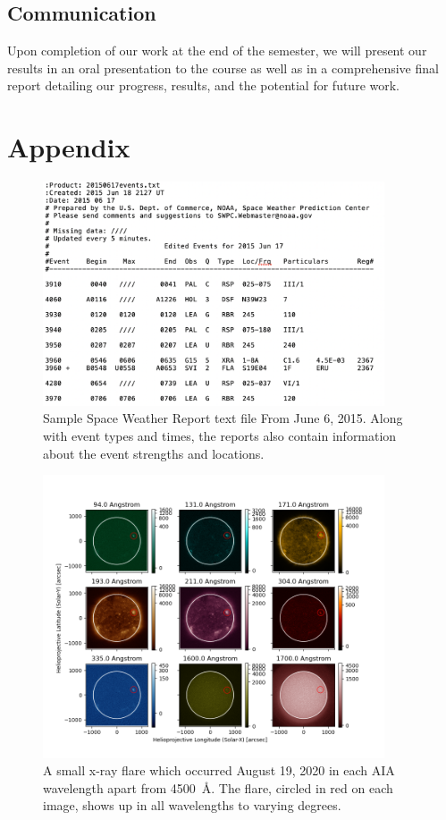 \documentclass[12pt, letterpaper]{article}
\begin{document}
\subsection*{Communication}
Upon completion of our work at the end of the semester, we will present our results in an oral presentation to the course as well as in a comprehensive final report detailing our progress, results, and the potential for future work.






\pagebreak
\section*{Appendix}


\begin{figure}[ht]
    \includegraphics[width=0.9\textwidth]{figures/swr_sample.png}
    \centering
    \caption{Sample Space Weather Report text file From June 6, 2015. Along with event types and times, the reports also contain information about the event strengths and locations.}
    \label{swr_sample}
\end{figure}

\begin{figure}[ht]
	\includegraphics[width=0.9\textwidth]{figures/0819_flare_labeled.png}
	\centering
	\caption{A small x-ray flare which occurred August 19, 2020 in each AIA wavelength apart from 4500~\AA{}. The flare, circled in red on each image, shows up in all wavelengths to varying degrees.}
	\label{flare}
\end{figure}
\end{document}
